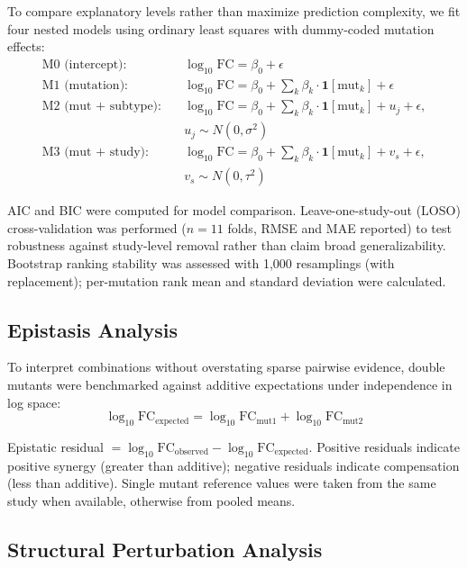 \documentclass[preprint]{elsarticle}
\begin{document}
To compare explanatory levels rather than maximize prediction complexity, we fit four nested models using ordinary least squares with dummy-coded mutation effects:
\begin{align}
\text{M0 (intercept):} &\quad \log_{10}\text{FC} = \beta_0 + \epsilon \\
\text{M1 (mutation):} &\quad \log_{10}\text{FC} = \beta_0 + \sum_k \beta_k \cdot \mathbf{1}[\text{mut}_k] + \epsilon \\
\text{M2 (mut + subtype):} &\quad \log_{10}\text{FC} = \beta_0 + \sum_k \beta_k \cdot \mathbf{1}[\text{mut}_k] + u_j + \epsilon, \\
&\quad u_j \sim N(0, \sigma^2) \\
\text{M3 (mut + study):} &\quad \log_{10}\text{FC} = \beta_0 + \sum_k \beta_k \cdot \mathbf{1}[\text{mut}_k] + v_s + \epsilon, \\
&\quad v_s \sim N(0, \tau^2)
\end{align}

AIC and BIC were computed for model comparison. Leave-one-study-out (LOSO) cross-validation was performed ($n=11$ folds, RMSE and MAE reported) to test robustness against study-level removal rather than claim broad generalizability. Bootstrap ranking stability was assessed with 1,000 resamplings (with replacement); per-mutation rank mean and standard deviation were calculated.

\subsection{Epistasis Analysis}

To interpret combinations without overstating sparse pairwise evidence, double mutants were benchmarked against additive expectations under independence in log space:
\begin{equation}
\log_{10}\text{FC}_{\text{expected}} = \log_{10}\text{FC}_{\text{mut1}} + \log_{10}\text{FC}_{\text{mut2}}
\end{equation}

Epistatic residual $= \log_{10}\text{FC}_{\text{observed}} - \log_{10}\text{FC}_{\text{expected}}$. Positive residuals indicate positive synergy (greater than additive); negative residuals indicate compensation (less than additive). Single mutant reference values were taken from the same study when available, otherwise from pooled means.

\subsection{Structural Perturbation Analysis}
\end{document}

